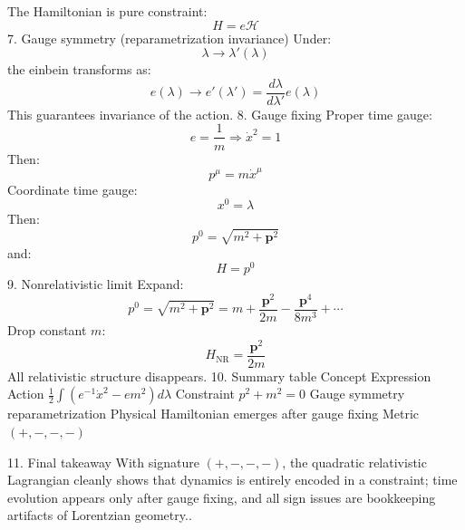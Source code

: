 The Hamiltonian is pure constraint:
\[
H = e \mathcal{H}
\]
7. Gauge symmetry (reparametrization invariance)
Under:
\[
\lambda \to \lambda'(\lambda)
\]
the einbein transforms as:
\[
e(\lambda) \to e'(\lambda') = \frac{d\lambda}{d\lambda'} e(\lambda)
\]
This guarantees invariance of the action.
8. Gauge fixing
Proper time gauge:
\[
e = \frac{1}{m}
\Rightarrow
\dot x^2 = 1
\]
Then:
\[
p^\mu = m \dot x^\mu
\]
Coordinate time gauge:
\[
x^0 = \lambda
\]
Then:
\[
p^0 = \sqrt{m^2 + \mathbf{p}^2}
\]
and:
\[
H = p^0
\]
9. Nonrelativistic limit
Expand:
\[
p^0 = \sqrt{m^2 + \mathbf{p}^2}
= m + \frac{\mathbf{p}^2}{2m} - \frac{\mathbf{p}^4}{8m^3} + \cdots
\]
Drop constant \(m\):
\[
H_{\text{NR}} = \frac{\mathbf{p}^2}{2m}
\]
All relativistic structure disappears.
10. Summary table
Concept	Expression
Action	\(\frac12 \int (e^{-1}\dot x^2 - e m^2) d\lambda\)
Constraint	\(p^2 + m^2 = 0\)
Gauge symmetry	reparametrization
Physical Hamiltonian	emerges after gauge fixing
Metric	\((+,-,-,-)\)


11. Final takeaway
With signature \((+,-,-,-)\), the quadratic relativistic Lagrangian cleanly shows that dynamics is entirely encoded in a constraint; time evolution appears only after gauge fixing, and all sign issues are bookkeeping artifacts of Lorentzian geometry..

